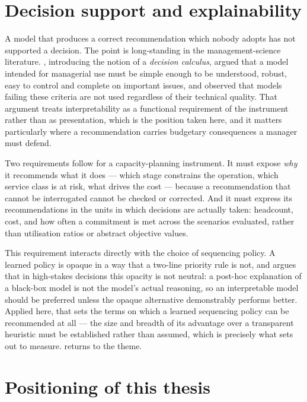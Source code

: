 \section{Decision support and explainability}
\label{sec:lit-dss}

A model that produces a correct recommendation which nobody adopts has not supported a decision.
The point is long-standing in the management-science literature. \citet{little1970}, introducing
the notion of a \emph{decision calculus}, argued that a model intended for managerial use must
be simple enough to be understood, robust, easy to control and complete on important issues, and
observed that models failing these criteria are not used regardless of their technical quality.
That argument treats interpretability as a functional requirement of the instrument rather than
as presentation, which is the position taken here, and it matters particularly where a
recommendation carries budgetary consequences a manager must defend.

Two requirements follow for a capacity-planning instrument. It must expose \emph{why} it
recommends what it does --- which stage constrains the operation, which service class is at
risk, what drives the cost --- because a recommendation that cannot be interrogated cannot be
checked or corrected. And it must express its recommendations in the units in which decisions
are actually taken: headcount, cost, and how often a commitment is met across the scenarios
evaluated, rather than utilisation ratios or abstract objective values.

This requirement interacts directly with the choice of sequencing policy. A learned policy is
opaque in a way that a two-line priority rule is not, and \citet{rudin2019} argues that in
high-stakes decisions this opacity is not neutral: a post-hoc explanation of a black-box model is
not the model's actual reasoning, so an interpretable model should be preferred unless the
opaque alternative demonstrably performs better. Applied here, that sets the terms on which a
learned sequencing policy can be recommended at all --- the size and breadth of its advantage
over a transparent heuristic must be established rather than assumed, which is precisely what
 sets out to measure.  returns to the theme.

\section{Positioning of this thesis}
\label{sec:lit-gap}

